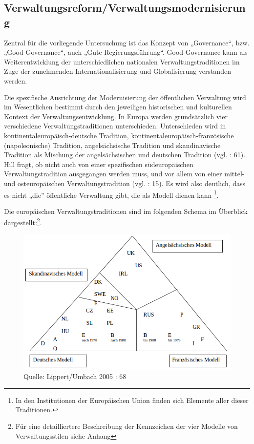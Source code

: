 \subsection{Verwaltungsreform/Verwaltungsmodernisierung }
Zentral für die vorliegende Untersuchung ist das Konzept von „Governance“, bzw. „Good Governance“, auch „Gute Regierungsführung“. Good Governance kann als Weiterentwicklung der unterschiedlichen nationalen Verwaltungstraditionen im Zuge der zunehmenden Internationalisierung und Globalisierung verstanden werden.
\par
Die spezifische Ausrichtung der Modernisierung der öffentlichen Verwaltung wird im Wesentlichen bestimmt durch den jeweiligen historischen und kulturellen Kontext der Verwaltungsentwicklung. In Europa werden grundsätzlich vier verschiedene Verwaltungstraditionen unterschieden. Unterschieden wird in kontinentaleuropäisch-deutsche Tradition, kontinentaleuropäisch-französische (napoleonische) Tradition, angelsächsische Tradition und skandinavische Tradition als Mischung der angelsächsischen und deutschen Tradition (vgl. \cite{lipumb05}: 61). Hill fragt, ob nicht auch von einer spezifischen südeuropäischen Verwaltungstradition ausgegangen werden muss, und vor allem von einer mittel- und osteuropäischen Verwaltungstradition (vgl. \cite{hill06}: 15). Es wird also deutlich, dass es nicht „die” öffentliche Verwaltung gibt, die als Modell dienen kann \footnote{In den Institutionen der Europäischen Union finden sich Elemente aller dieser Traditionen.}.
\par
Die europäischen Verwaltungstraditionen sind im folgenden Schema im Überblick dargestellt:\footnote{Für eine detailliertere Beschreibung der Kennzeichen der vier Modelle von Verwaltungsstilen siehe Anhang }.
\begin{figure}[H]
  \centering
  \includegraphics[width=5in]{Material/VerwaltungsModelle}
  \caption{Quelle: Lippert/Umbach 2005 \cite{lipumb05}: 68}
\end{figure}

